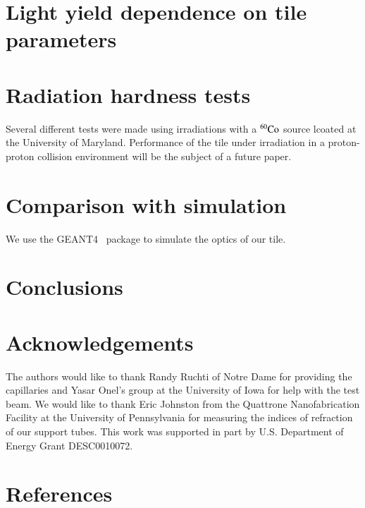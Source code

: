 \documentclass[review]{elsarticle}
\begin{document}
\section{Light yield dependence on tile parameters}

\section{Radiation hardness tests}

Several different tests were made using irradiations with a $\rm{^{60}Co}$ source lcoated at the University of Maryland.  Performance of the tile under irradiation in a proton-proton collision environment will be the subject of a future paper.

\section{Comparison with simulation}
We use the GEANT4~\cite{Agostinelli2003250} package to simulate the optics of our tile.  


\section{Conclusions}

\section{Acknowledgements}
The authors would like to thank Randy Ruchti of Notre Dame for providing the capillaries and Yasar Onel's group at the University of Iowa for help with the test beam.  We would like to thank Eric Johnston from the Quattrone Nanofabrication Facility  at the University of Pennsylvania for measuring the indices of refraction of our support tubes.
This work was supported in part by U.S. Department of Energy Grant DESC0010072.

\section*{References}


\end{document}
